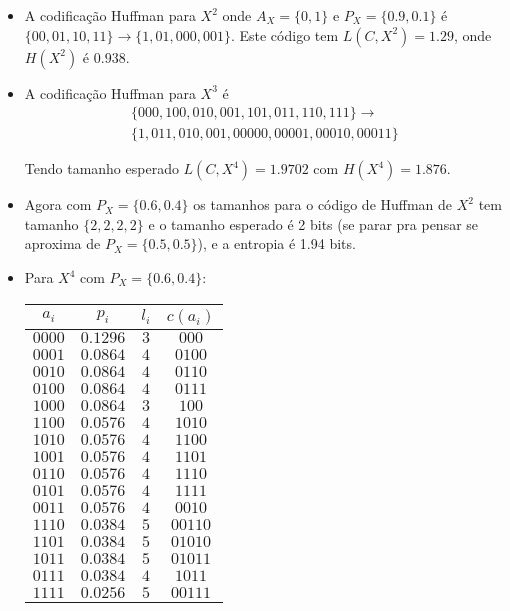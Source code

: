 \begin{itemize}
    \item 
    A codificação Huffman para $X^2$ onde $A_X = \{0, 1\}$ e $P_X = \{0.9, 0.1\}$ é $\{00, 01, 10, 11\} \rightarrow \{1, 01, 000, 001\}$. Este código tem $L(C, X^2) = 1.29$, onde $H(X^2)$ é $0.938$.
    
    \item
    A codificação Huffman para $X^3$ é
    \[\begin{array}{l}
        \{ 000,100,010,001,101,011,110,111\}  \to \\
        \{ 1,011,010,001,00000,00001,00010,00011\} 
        \end{array}\]
    
    Tendo tamanho esperado $L(C, X^4) = 1.9702$ com $H(X^4) = 1.876$.
    
    \item
    Agora com $P_X = \{0.6, 0.4\}$ os tamanhos para o código de Huffman de $X^2$ tem tamanho $\{2, 2, 2, 2\}$ e o tamanho esperado é 2 bits (se parar pra pensar se aproxima de $P_X = \{0.5, 0.5\}$), e a entropia é 1.94 bits.
    
    \item
    Para $X^4$ com $P_X = \{0.6, 0.4\}$:
    
    \begin{tabular}{c c c c}
    \hline
    $a_i$ & $p_i$ & $l_i$ & $c(a_i)$ \\
    \hline
    $0000$ & $0.1296$ & $3$ & $000$ \\
    $0001$ & $0.0864$ & $4$ & $0100$ \\
    $0010$ & $0.0864$ & $4$ & $0110$ \\
    $0100$ & $0.0864$ & $4$ & $0111$ \\
    $1000$ & $0.0864$ & $3$ & $100$ \\
    $1100$ & $0.0576$ & $4$ & $1010$ \\
    $1010$ & $0.0576$ & $4$ & $1100$ \\
    $1001$ & $0.0576$ & $4$ & $1101$ \\
    $0110$ & $0.0576$ & $4$ & $1110$ \\
    $0101$ & $0.0576$ & $4$ & $1111$ \\
    $0011$ & $0.0576$ & $4$ & $0010$ \\
    $1110$ & $0.0384$ & $5$ & $00110$ \\
    $1101$ & $0.0384$ & $5$ & $01010$ \\
    $1011$ & $0.0384$ & $5$ & $01011$ \\
    $0111$ & $0.0384$ & $4$ & $1011$ \\
    $1111$ & $0.0256$ & $5$ & $00111$ \\
    \hline
    \end{tabular}
    
\end{itemize}




